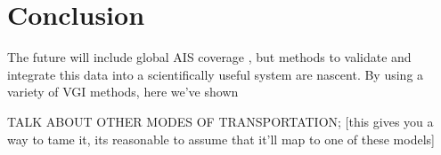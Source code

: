 \section{Conclusion}



The future will include global AIS coverage \cite{JonesGoogle2012,carson2012satellite}, but methods to validate and integrate this data into a scientifically useful system are nascent. By using a variety of VGI methods, here we've shown %







    TALK ABOUT OTHER MODES OF TRANSPORTATION; [this gives you a way to tame it, its reasonable to assume that it'll map to one of these models]
